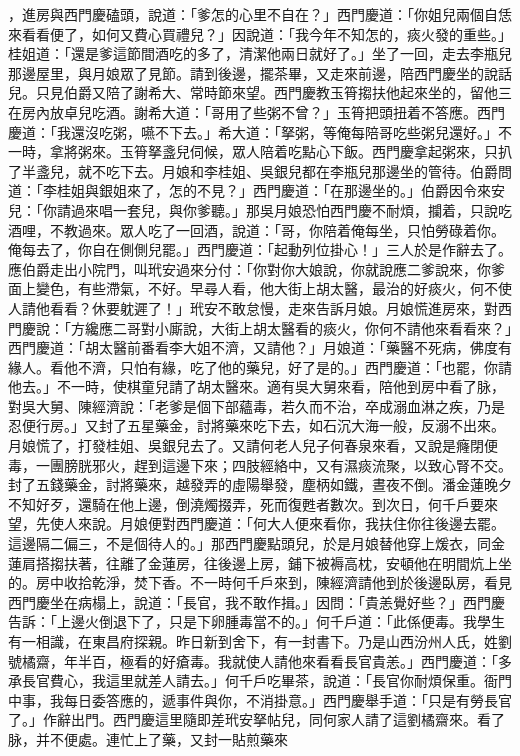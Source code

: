 \begin{showcontents}{}
，進房與西門慶磕頭，說道：「爹怎的心里不自在？」西門慶道：「你姐兒兩個自恁來看看便了，如何又費心買禮兒？」因說道：「我今年不知怎的，痰火發的重些。」桂姐道：「還是爹這節間酒吃的多了，清潔他兩日就好了。」坐了一回，走去李瓶兒那邊屋里，與月娘眾了見節。請到後邊，擺茶畢，又走來前邊，陪西門慶坐的說話兒。只見伯爵又陪了謝希大、常時節來望。西門慶教玉筲搊扶他起來坐的，留他三在房內放卓兒吃酒。謝希大道：「哥用了些粥不曾？」玉筲把頭扭着不答應。西門慶道：「我還沒吃粥，嚥不下去。」希大道：「拏粥，等俺每陪哥吃些粥兒還好。」不一時，拿將粥來。玉筲拏盞兒伺候，眾人陪着吃點心下飯。西門慶拿起粥來，只扒了半盞兒，就不吃下去。月娘和李桂姐、吳銀兒都在李瓶兒那邊坐的管待。伯爵問道：「李桂姐與銀姐來了，怎的不見？」西門慶道：「在那邊坐的。」伯爵因令來安兒：「你請過來唱一套兒，與你爹聽。」那吳月娘恐怕西門慶不耐煩，攔着，只說吃酒哩，不教過來。眾人吃了一回酒，說道：「哥，你陪着俺每坐，只怕勞碌着你。俺每去了，你自在側側兒罷。」西門慶道：「起動列位掛心！」三人於是作辭去了。應伯爵走出小院門，叫玳安過來分付：「你對你大娘說，你就說應二爹說來，你爹面上變色，有些滯氣，不好。早尋人看，他大街上胡太醫，最治的好痰火，何不使人請他看看？休要躭遲了！」玳安不敢怠慢，走來告訴月娘。月娘慌進房來，對西門慶說：「方纔應二哥對小廝說，大街上胡太醫看的痰火，你何不請他來看看來？」西門慶道：「胡太醫前番看李大姐不濟，又請他？」月娘道：「藥醫不死病，佛度有緣人。看他不濟，只怕有緣，吃了他的藥兒，好了是的。」西門慶道：「也罷，你請他去。」不一時，使棋童兒請了胡太醫來。適有吳大舅來看，陪他到房中看了脉，對吳大舅、陳經濟說：「老爹是個下部蘊毒，若久而不治，卒成溺血淋之疾，乃是忍便行房。」又封了五星藥金，討將藥來吃下去，如石沉大海一般，反溺不出來。月娘慌了，打發桂姐、吳銀兒去了。又請何老人兒子何春泉來看，又說是癃閉便毒，一團膀胱邪火，趕到這邊下來；四肢經絡中，又有濕痰流聚，以致心腎不交。封了五錢藥金，討將藥來，越發弄的虛陽舉發，塵柄如鐵，晝夜不倒。潘金蓮晚夕不知好歹，還騎在他上邊，倒澆燭掇弄，死而復甦者數次。到次日，何千戶要來望，先使人來說。月娘便對西門慶道：「何大人便來看你，我扶住你往後邊去罷。這邊隔二偏三，不是個待人的。」那西門慶點頭兒，於是月娘替他穿上煖衣，同金蓮肩搭搊扶著，往離了金蓮房，往後邊上房，鋪下被褥高枕，安頓他在明間炕上坐的。房中收拾乾淨，焚下香。不一時何千戶來到，陳經濟請他到於後邊臥房，看見西門慶坐在病榻上，說道：「長官，我不敢作揖。」因問：「貴恙覺好些？」西門慶告訴：「上邊火倒退下了，只是下卵腫毒當不的。」何千戶道：「此係便毒。我學生有一相識，在東昌府探親。昨日新到舍下，有一封書下。乃是山西汾州人氏，姓劉號橘齋，年半百，極看的好瘡毒。我就使人請他來看看長官貴恙。」西門慶道：「多承長官費心，我這里就差人請去。」何千戶吃畢茶，說道：「長官你耐煩保重。衙門中事，我每日委答應的，遞事件與你，不消掛意。」西門慶舉手道：「只是有勞長官了。」作辭出門。西門慶這里隨即差玳安拏帖兒，同何家人請了這劉橘齋來。看了脉，并不便處。連忙上了藥，又封一貼煎藥來
\end{showcontents}
